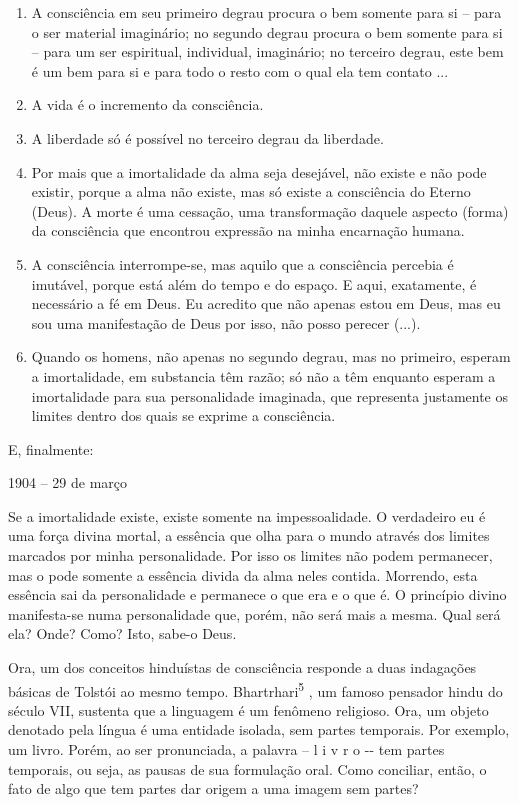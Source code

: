 \begin{enumerate}
\def\labelenumi{\arabic{enumi})}
\item
  A consciência em seu primeiro degrau procura o bem somente para si --
  para o ser material imaginário; no segundo degrau procura o bem
  somente para si -- para um ser espiritual, individual, imaginário; no
  terceiro degrau, este bem é um bem para si e para todo o resto com o
  qual ela tem contato ...
\item
  A vida é o incremento da consciência.
\item
  A liberdade só é possível no terceiro degrau da liberdade.
\item
  Por mais que a imortalidade da alma seja desejável, não existe e não
  pode existir, porque a alma não existe, mas só existe a consciência do
  Eterno (Deus). A morte é uma cessação, uma transformação daquele
  aspecto (forma) da consciência que encontrou expressão na minha
  encarnação humana.
\item
  A consciência interrompe-se, mas aquilo que a consciência percebia é
  imutável, porque está além do tempo e do espaço. E aqui, exatamente, é
  necessário a fé em Deus. Eu acredito que não apenas estou em Deus, mas
  eu sou uma manifestação de Deus por isso, não posso perecer (...).
\item
  Quando os homens, não apenas no segundo degrau, mas no primeiro,
  esperam a imortalidade, em substancia têm razão; só não a têm enquanto
  esperam a imortalidade para sua personalidade imaginada, que
  representa justamente os limites dentro dos quais se exprime a
  consciência.
\end{enumerate}

E, finalmente:

1904 -- 29 de março

Se a imortalidade existe, existe somente na impessoalidade. O verdadeiro
eu é uma força divina mortal, a essência que olha para o mundo através
dos limites marcados por minha personalidade. Por isso os limites não
podem permanecer, mas o pode somente a essência divida da alma neles
contida. Morrendo, esta essência sai da personalidade e permanece o que
era e o que é. O princípio divino manifesta-se numa personalidade que,
porém, não será mais a mesma. Qual será ela? Onde? Como? Isto, sabe-o
Deus.

Ora, um dos conceitos hinduístas de consciência responde a duas
indagações básicas de Tolstói ao mesmo tempo.
Bhartrhari\textsuperscript{5} , um famoso pensador hindu do século VII,
sustenta que a linguagem é um fenômeno religioso. Ora, um objeto
denotado pela língua é uma entidade isolada, sem partes temporais. Por
exemplo, um livro. Porém, ao ser pronunciada, a palavra -- l i v r o
-\/- tem partes temporais, ou seja, as pausas de sua formulação oral.
Como conciliar, então, o fato de algo que tem partes dar origem a uma
imagem sem partes?

